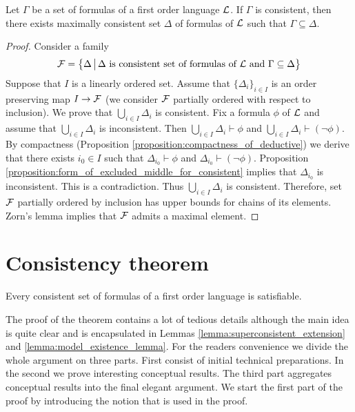 \begin{proposition}\label{proposition:Lindenbaum_lemma}
Let $\Gamma$ be a set of formulas of a first order language ${\mathcal L}$. If $\Gamma$ is consistent, then there exists maximally consistent set $\Delta$ of formulas of ${\mathcal L}$ such that $\Gamma \subseteq \Delta$.
\end{proposition}
\begin{proof}
Consider a family
$${\mathcal F} = \big\{\Delta \,\big|\,\Delta\mbox{ is consistent set of formulas of }{\mathcal L}\mbox{ and }\Gamma \subseteq \Delta \big\}$$
Suppose that $I$ is a linearly ordered set. Assume that $\{\Delta_i\}_{i\in I}$ is an order preserving map $I \rightarrow {\mathcal F}$ (we consider ${\mathcal F}$ partially ordered with respect to inclusion). We prove that $\bigcup_{i\in I}\Delta_i$ is consistent. Fix a formula $\phi$ of ${\mathcal L}$ and assume that $\bigcup_{i\in I}\Delta_i$ is inconsistent. Then $\bigcup_{i\in I}\Delta_i\vdash \phi$ and $\bigcup_{i\in I}\Delta_i\vdash (\neg \phi)$. By compactness (Proposition \ref{proposition:compactness_of_deductive}) we derive that there exists $i_0\in I$ such that $\Delta_{i_0} \vdash \phi$ and $\Delta_{i_0} \vdash (\neg \phi)$. Proposition \ref{proposition:form_of_excluded_middle_for_consistent} implies that $\Delta_{i_0}$ is inconsistent. This is a contradiction. Thus $\bigcup_{i\in I}\Delta_i$ is consistent. Therefore, set ${\mathcal F}$ partially ordered by inclusion has upper bounds for chains of its elements. Zorn’s lemma implies that ${\mathcal F}$ admits a maximal element.
\end{proof}

\section{Consistency theorem}

\begin{theorem}\label{theorem:consistency_theorem}
Every consistent set of formulas of a first order language is satisfiable.
\end{theorem}
\noindent
The proof of the theorem contains a lot of tedious details although the main idea is quite clear
and is encapsulated in Lemmas \ref{lemma:superconsistent_extension} and \ref{lemma:model_existence_lemma}. For the readers convenience we divide the whole argument
on three parts. First consist of initial technical preparations. In the second we prove interesting
conceptual results. The third part aggregates conceptual results into the final elegant argument.
We start the first part of the proof by introducing the notion that is used in the proof.

